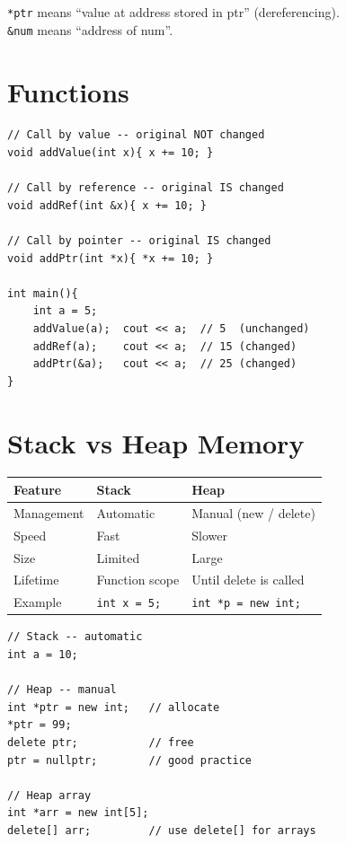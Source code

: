\documentclass[12pt,a4paper]{report}
\begin{document}
\begin{notebox}
\texttt{*ptr} means ``value at address stored in ptr'' (dereferencing).\\
\texttt{\&num} means ``address of num''.
\end{notebox}

\section{Functions}

\begin{lstlisting}[caption={Functions -- Call by Value, Reference, Pointer}]
// Call by value -- original NOT changed
void addValue(int x){ x += 10; }

// Call by reference -- original IS changed
void addRef(int &x){ x += 10; }

// Call by pointer -- original IS changed
void addPtr(int *x){ *x += 10; }

int main(){
    int a = 5;
    addValue(a);  cout << a;  // 5  (unchanged)
    addRef(a);    cout << a;  // 15 (changed)
    addPtr(&a);   cout << a;  // 25 (changed)
}
\end{lstlisting}

\section{Stack vs Heap Memory}

\begin{center}
\begin{tabular}{|l|l|l|}
\hline
\textbf{Feature}  & \textbf{Stack}      & \textbf{Heap} \\
\hline
Management        & Automatic           & Manual (new / delete) \\
Speed             & Fast                & Slower \\
Size              & Limited             & Large \\
Lifetime          & Function scope      & Until delete is called \\
Example           & \texttt{int x = 5;} & \texttt{int *p = new int;} \\
\hline
\end{tabular}
\end{center}

\begin{lstlisting}[caption={Stack vs Heap}]
// Stack -- automatic
int a = 10;

// Heap -- manual
int *ptr = new int;   // allocate
*ptr = 99;
delete ptr;           // free
ptr = nullptr;        // good practice

// Heap array
int *arr = new int[5];
delete[] arr;         // use delete[] for arrays
\end{lstlisting}
\end{document}
